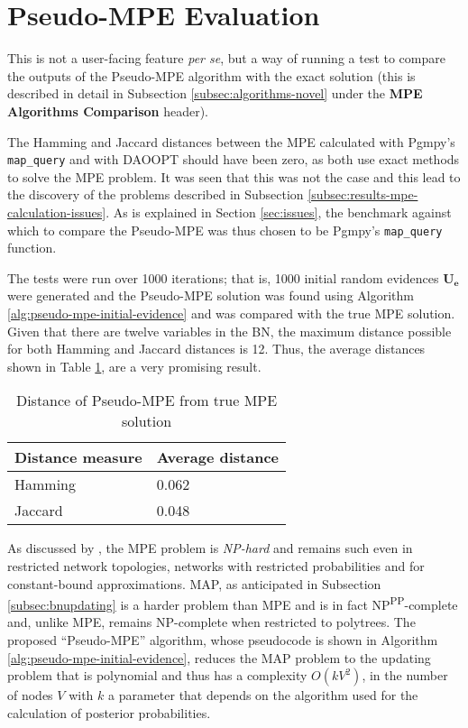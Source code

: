 \section{Pseudo-MPE Evaluation} \label{sec:pseudo-mpe-evaluation}
This is not a user-facing feature \textit{per se}, but a way of running a test to compare the outputs of the Pseudo-MPE algorithm with the exact solution (this is described in detail in Subsection \ref{subsec:algorithms-novel} under the \textbf{MPE Algorithms Comparison} header).

The Hamming and Jaccard distances between the MPE calculated with Pgmpy's \texttt{map\_query} and with DAOOPT should have been zero, as both use exact methods to solve the MPE problem.
It was seen that this was not the case and this lead to the discovery of the problems described in Subsection \ref{subsec:results-mpe-calculation-issues}.
As is explained in Section \ref{sec:issues}, the benchmark against which to compare the Pseudo-MPE was thus chosen to be Pgmpy's \texttt{map\_query} function.

The tests were run over 1000 iterations; that is, 1000 initial random evidences $\boldsymbol{U_e}$ were generated and the Pseudo-MPE solution was found using Algorithm \ref{alg:pseudo-mpe-initial-evidence} and was compared with the true MPE solution.
Given that there are twelve variables in the BN, the maximum distance possible for both Hamming and Jaccard distances is 12.
Thus, the average distances shown in Table \ref{tab:mpe-vs-pseudo-results}, are a very promising result.

\begin{table}[h]
	\centering
	\caption{Distance of Pseudo-MPE from true MPE solution}
	\begin{tabularx}{0.5\textwidth}{Xl}
		\toprule
		Distance measure & Average distance  \\
		\midrule	
		Hamming & 0.062 \\
		Jaccard & 0.048 \\
		\bottomrule
		\end{tabularx}
	\label{tab:mpe-vs-pseudo-results}
\end{table}

As discussed by \citet{gamez2013advances}, the MPE problem is \textit{NP-hard} and remains such even in restricted network topologies, networks with restricted probabilities and for constant-bound approximations.
MAP, as anticipated in Subsection \ref{subsec:bnupdating} is a harder problem than MPE and is in fact NP\textsuperscript{PP}-complete and, unlike MPE, remains NP-complete when restricted to polytrees.
The proposed \enquote{Pseudo-MPE} algorithm, whose pseudocode is shown in Algorithm \ref{alg:pseudo-mpe-initial-evidence}, reduces the MAP problem to the updating problem that is polynomial and thus has a complexity $O(kV^2)$, in the number of nodes $V$ with $k$ a parameter that depends on the algorithm used for the calculation of posterior probabilities.

